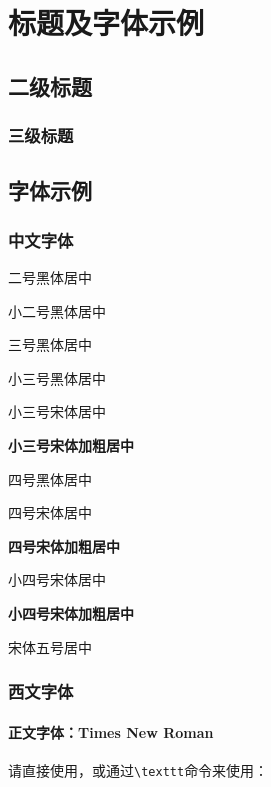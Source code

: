 \chapter{标题及字体示例}

\section{二级标题}

\subsection{三级标题}

\section{字体示例}

\subsection{中文字体}

\begin{center}
    \heiti 二号黑体居中

    \heiti 小二号黑体居中

    \heiti 三号黑体居中

    \heiti 小三号黑体居中
    
    \songti 小三号宋体居中
    
    {\bfseries\songti 小三号宋体加粗居中}

    \heiti 四号黑体居中
    
    \songti 四号宋体居中

    {\bfseries\songti 四号宋体加粗居中}
    
    \songti 小四号宋体居中
    
    {\bfseries\songti 小四号宋体加粗居中}
    
    \songti{} 宋体五号居中
\end{center}

\subsection{西文字体}

\subsubsection{正文字体：Times New Roman}
请直接使用，或通过\texttt{\textbackslash texttt}命令来使用：

